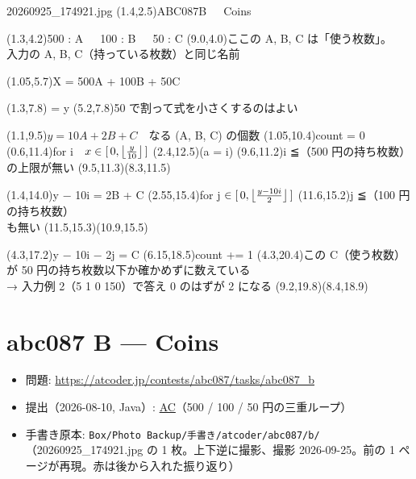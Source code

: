 \documentclass[a4paper]{article}
\begin{document}
\begin{memopage}{20260925\_174921.jpg}
  \hw(1.4,2.5){ABC087B\ \ \ Coins}

  \hw(1.3,4.2){500 : A\ \ \ 100 : B\ \ \ 50 : C}
  \redpen(9.0,4.0){ここの A, B, C は「使う枚数」。\\入力の A, B, C（持っている枚数）と同じ名前}

  \hw(1.05,5.7){X = 500A + 100B + 50C}

  \hwm(1.3,7.8){ = y}
  \redpen(5.2,7.8){50 で割って式を小さくするのはよい}

  \hw(1.1,9.5){$y = 10A + 2B + C$\ \ なる (A, B, C) の個数}
  \hw(1.05,10.4){\large count = 0}
  \hw(0.6,11.4){for i\ \ $x \in [\,0, \left\lfloor \frac{y}{10} \right\rfloor\,]$}
  \hw(2.4,12.5){\large (a = i)}
  \redpen(9.6,11.2){i ≦（500 円の持ち枚数）の上限が無い}
  \redarrow(9.5,11.3)(8.3,11.5)

  \hw(1.4,14.0){y − 10i = 2B + C}
  \hw(2.55,15.4){for j $\in [\,0, \left\lfloor \frac{y-10i}{2} \right\rfloor\,]$}
  \redpen(11.6,15.2){j ≦（100 円の持ち枚数）\\も無い}
  \redarrow(11.5,15.3)(10.9,15.5)

  \hw(4.3,17.2){y − 10i − 2j = C}
  \hw(6.15,18.5){\large count += 1}
  \redpen(4.3,20.4){この C（使う枚数）が 50 円の持ち枚数以下か確かめずに数えている\\→ 入力例 2（5 1 0 150）で答え 0 のはずが 2 になる}
  \redarrow(9.2,19.8)(8.4,18.9)
\end{memopage}

\clearpage
\section*{abc087 B --- Coins}

\begin{itemize}
  \item 問題: \url{https://atcoder.jp/contests/abc087/tasks/abc087_b}
  \item 提出（2026-08-10, Java）:
    \href{https://atcoder.jp/contests/abc087/submissions/78284765}{AC}（500 / 100 / 50 円の三重ループ）
  \item 手書き原本: \texttt{Box/Photo Backup/手書き/atcoder/abc087/b/}（20260925\_174921.jpg の 1 枚。上下逆に撮影、撮影 2026-09-25。前の 1 ページが再現。赤は後から入れた振り返り）
\end{itemize}
\end{document}
